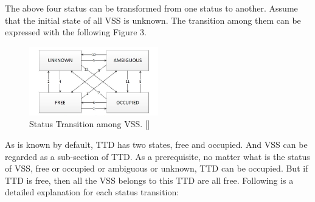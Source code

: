 \documentclass[article,dr=phil,type=drfinal,colorback,accentcolor=tud9c]{tudthesis}
\begin{document}
  The above four status can be transformed from one status to another. Assume that the initial state of all VSS is unknown. The transition among them can be expressed with the following Figure 3.
  
  \begin{figure}[H]
  	\begin{center}
  		\includegraphics[width=0.5\textwidth]{fig3}
  		\caption[Caption for LOF]{Status Transition among VSS. []}
  	\end{center}
  \end{figure}

  As is known by default, TTD has two states, free and occupied. And VSS can be regarded as a sub-section of TTD. As a prerequisite, no matter what is the status of VSS, free or occupied or ambiguous or unknown, TTD can be occupied. But if TTD is free, then all the VSS belongs to this TTD are all free. Following is a detailed explanation for each status transition:
  
\end{document}
